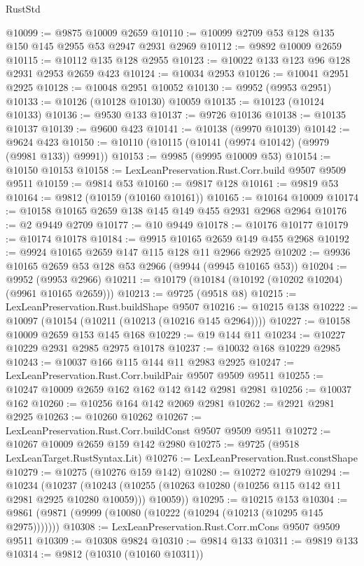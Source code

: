 \begin{lexlean}{RustStd}
\begin{coremodule}
@10099 := @9875 @10009 @2659
@10110 := @10099 @2709 @53 @128 @135 @150 @145 @2955 @53 @2947 @2931 @2969
@10112 := @9892 @10009 @2659
@10115 := @10112 @135 @128 @2955
@10123 := @10022 @133 @123 @96 @128 @2931 @2953 @2659 @423
@10124 := @10034 @2953
@10126 := @10041 @2951 @2925
@10128 := @10048 @2951 @10052
@10130 := @9952 (@9953 @2951)
@10133 := @10126 (@10128 @10130) @10059
@10135 := @10123 (@10124 @10133)
@10136 := @9530 @133
@10137 := @9726 @10136
@10138 := @10135 @10137
@10139 := @9600 @423
@10141 := @10138 (@9970 @10139)
@10142 := @9624 @423
@10150 := @10110 (@10115 (@10141 (@9974 @10142) (@9979 (@9981 @133)) @9991))
@10153 := @9985 (@9995 @10009 @53)
@10154 := @10150 @10153
@10158 := LexLeanPreservation.Rust.Corr.build @9507 @9509 @9511
@10159 := @9814 @53
@10160 := @9817 @128
@10161 := @9819 @53
@10164 := @9812 (@10159 (@10160 @10161))
@10165 := @10164 @10009
@10174 := @10158 @10165 @2659 @138 @145 @149 @455 @2931 @2968 @2964
@10176 := @2 @9449 @2709
@10177 := @10 @9449
@10178 := @10176 @10177
@10179 := @10174 @10178
@10184 := @9915 @10165 @2659 @149 @455 @2968
@10192 := @9924 @10165 @2659 @147 @115 @128 @11 @2966 @2925
@10202 := @9936 @10165 @2659 @53 @128 @53 @2966 (@9944 (@9945 @10165 @53))
@10204 := @9952 (@9953 @2966)
@10211 := @10179 (@10184 (@10192 (@10202 @10204) (@9961 @10165 @2659)))
@10213 := @9725 (@9518 @8)
@10215 := LexLeanPreservation.Rust.buildShape @9507
@10216 := @10215 @138
@10222 := @10097 (@10154 (@10211 (@10213 (@10216 @145 @2964))))
@10227 := @10158 @10009 @2659 @153 @145 @168
@10229 := @19 @144 @11
@10234 := @10227 @10229 @2931 @2985 @2975 @10178
@10237 := @10032 @168 @10229 @2985
@10243 := @10037 @166 @115 @144 @11 @2983 @2925
@10247 := LexLeanPreservation.Rust.Corr.buildPair @9507 @9509 @9511
@10255 := @10247 @10009 @2659 @162 @162 @142 @142 @2981 @2981
@10256 := @10037 @162
@10260 := @10256 @164 @142 @2069 @2981
@10262 := @2921 @2981 @2925
@10263 := @10260 @10262
@10267 := LexLeanPreservation.Rust.Corr.buildConst @9507 @9509 @9511
@10272 := @10267 @10009 @2659 @159 @142 @2980
@10275 := @9725 (@9518 LexLeanTarget.RustSyntax.Lit)
@10276 := LexLeanPreservation.Rust.constShape
@10279 := @10275 (@10276 @159 @142)
@10280 := @10272 @10279
@10294 := @10234
    (@10237
      (@10243 (@10255 (@10263 @10280 (@10256 @115 @142 @11 @2981 @2925 @10280 @10059))) @10059))
@10295 := @10215 @153
@10304 := @9861 (@9871 (@9999 (@10080 (@10222 (@10294 (@10213 (@10295 @145 @2975)))))))
@10308 := LexLeanPreservation.Rust.Corr.mCons @9507 @9509 @9511
@10309 := @10308 @9824
@10310 := @9814 @133
@10311 := @9819 @133
@10314 := @9812 (@10310 (@10160 @10311))

\end{coremodule}
\end{lexlean}
